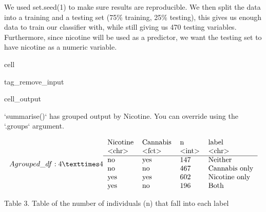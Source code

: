 \documentclass[letterpaper,10pt,english]{jupyterBook}
\begin{document}
\sphinxAtStartPar
We used set.seed(1) to make sure results are reproducible. We then split the data into a training and a testing set (75\% training, 25\% testing), this gives us enough data to train our classifier with, while still giving us 470 testing variables.
Furthermore, since nicotine will be used as a predictor, we want the testing set to have nicotine as a numeric variable.

\sphinxAtStartPar
{}

\begin{sphinxuseclass}{cell}
\begin{sphinxuseclass}{tag_remove_input}\begin{sphinxVerbatimOutput}

\begin{sphinxuseclass}{cell_output}
\begin{sphinxVerbatim}[commandchars=\\\{\}]
`summarise()` has grouped output by \PYGZsq{}Nicotine\PYGZsq{}. You can override using the `.groups` argument.
\end{sphinxVerbatim}
\begin{equation*}
\begin{split}A grouped\_df: 4 × 4
\begin{tabular}{llll}
 Nicotine & Cannabis & n & label\\
 <chr> & <fct> & <int> & <chr>\\
\hline
	 no  & yes & 147 & Neither      \\
	 no  & no  & 467 & Cannabis only\\
	 yes & yes & 602 & Nicotine only\\
	 yes & no  & 196 & Both         \\
\end{tabular}\end{split}
\end{equation*}
\end{sphinxuseclass}\end{sphinxVerbatimOutput}

\end{sphinxuseclass}
\end{sphinxuseclass}
\sphinxAtStartPar
Table 3. Table of the number of individuals (n) that fall into each label

\begin{DUlineblock}{0em}
\item[] 
\end{DUlineblock}
\end{document}

